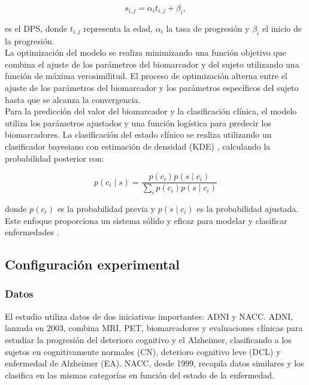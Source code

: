 \begin{equation} 
	s_{i,j} = \alpha_i t_{i,j} + \beta_i,
\end{equation}


es el DPS, donde \( t_{i,j} \) representa la edad, \( \alpha_i \) la tasa de progresión y \( \beta_i \) el inicio de la progresión.\\

La optimización del modelo se realiza minimizando una función objetivo que combina el ajuste de los parámetros del biomarcador y del sujeto utilizando una función de máxima verosimilitud. El proceso de optimización alterna entre el ajuste de los parámetros del biomarcador y los parámetros específicos del sujeto hasta que se alcanza la convergencia.\\

Para la predicción del valor del biomarcador y la clasificación clínica, el modelo utiliza los parámetros ajustados y una función logística para predecir los biomarcadores. La clasificación del estado clínico se realiza utilizando un clasificador bayesiano con estimación de densidad (KDE) \cite{parzen1962estimation}, calculando la probabilidad posterior con:

\begin{equation}
	p(c_i \mid s) = \frac{p(c_i) p(s \mid c_i)}{\sum_i p(c_i) p(s \mid c_i)}
\end{equation}

donde \( p(c_i) \) es la probabilidad previa y \( p(s \mid c_i) \) es la probabilidad ajustada. Este enfoque proporciona un sistema sólido y eficaz para modelar y clasificar enfermedades \cite{ghazi2021robust}.

\subsection{Configuración experimental}
\subsubsection{Datos}

El estudio utiliza datos de dos iniciativas importantes: ADNI y NACC. ADNI, lanzada en 2003, combina MRI, PET, biomarcadores y evaluaciones clínicas para estudiar la progresión del deterioro cognitivo y el Alzheimer, clasificando a los sujetos en cognitivamente normales (CN), deterioro cognitivo leve (DCL) y enfermedad de Alzheimer (EA). NACC, desde 1999, recopila datos similares y los clasifica en las mismas categorías en función del estado de la enfermedad.\\

